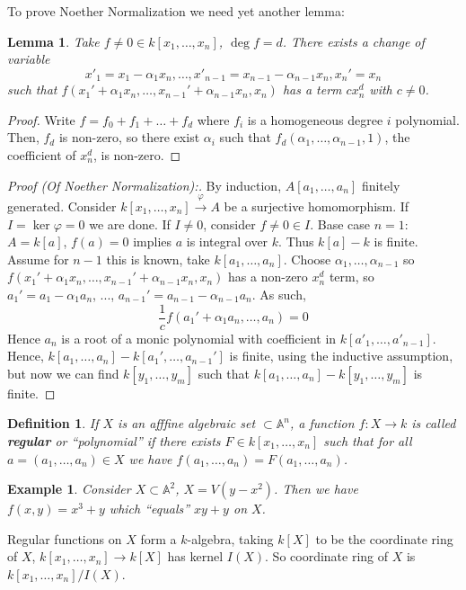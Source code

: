 \documentclass[12pt]{article}
\newcommand{\A}{\mathbb{A}}
\renewcommand{\phi}{\varphi}
\newtheorem{definition}{Definition}[section]
\newtheorem*{example}{Example}
\newtheorem{lemma}{Lemma}[section]
\begin{document}
    To prove Noether Normalization we need yet another lemma:
    \begin{lemma}
        Take $f \neq 0 \in k[x_1, \dots, x_n]$, $\deg f = d$. There exists a change of variable
         $$x'_1 = x_1 - \alpha_1 x_n, \dots, x'_{n-1} = x_{n-1} - \alpha_{n-1}x_n, x_n' = x_n$$
        such that $f(x_1' + \alpha_1x_n, \dots, x_{n-1}'+\alpha_{n-1}x_n, x_n)$ has a term $cx^d_n$ with $c \neq 0$.  
    \end{lemma}
    \begin{proof}
        Write $f = f_0 + f_1 + \dots + f_d$ where $f_i$ is a homogeneous degree $i$ polynomial. Then, $f_d$ is non-zero, so there exist $\alpha_i$ such that $f_d(\alpha_1, \dots, \alpha_{n-1}, 1)$, the coefficient of $x^d_n$, is non-zero.  
    \end{proof}
    \begin{proof}
        [Proof (Of Noether Normalization):] By induction, $A[a_1, \dots, a_n]$ finitely generated. Consider $k[x_1, \dots, x_n] \xrightarrow{\phi} A$ be a surjective homomorphism. If $I = \ker \phi = 0$ we are done. If $I \neq 0$, consider $f \neq 0 \in I$. Base case $n=1$: $A = k[a]$, $f(a) = 0$ implies $a$ is integral over $k$. Thus $k[a] - k$ is finite. Assume for $n-1$ this is known, take $k[a_1, \dots, a_n]$. Choose $\alpha_1, \dots, \alpha_{n-1}$ so $f(x_1' + \alpha_1x_n, \dots, x_{n-1}'+\alpha_{n-1}x_n, x_n)$ has a non-zero $x_n^d$ term, so $a_1' = a_1 - \alpha_1a_n$, ..., $a_{n-1}' = a_{n-1} - \alpha_{n-1}a_n$. As such, 
        $$\frac{1}{c}f(a_1' + \alpha_1a_n, \dots, a_n) = 0$$
        Hence $a_n$ is a root of a monic polynomial with coefficient in $k[a'_1, \dots, a'_{n-1}]$. Hence, $k[a_1, \dots, a_n] - k[a_1', \dots, a_{n-1}']$ is finite, using the inductive assumption, but now we can find $k[y_1, \dots, y_m]$ such that $k[a_1, \dots, a_n] - k[y_1, \dots, y_m]$ is finite. 
    \end{proof}
    \begin{definition}
        If $X$ is an afffine algebraic set $\subset \A^n$, a function $f: X \to k$ is called \textbf{regular} or ``polynomial'' if there exists $F \in k[x_1, \dots, x_n]$ such that for all $a = (a_1, \dots, a_n) \in X$ we have $f(a_1, \dots, a_n) = F(a_1, \dots, a_n)$. 
    \end{definition}
    \begin{example}
        Consider $X \subset \A^2$, $X = V(y-x^2)$. Then we have $f(x, y) = x^3 + y$ which ``equals'' $xy + y$ on $X$. 
    \end{example}
    Regular functions on $X$ form a $k$-algebra, taking $k[X]$ to be the coordinate ring of $X$, $k[x_1, \dots, x_n] \to k[X]$ has kernel $I(X)$. So coordinate ring of $X$ is $k[x_1, \dots, x_n]/I(X)$. 
\end{document}
